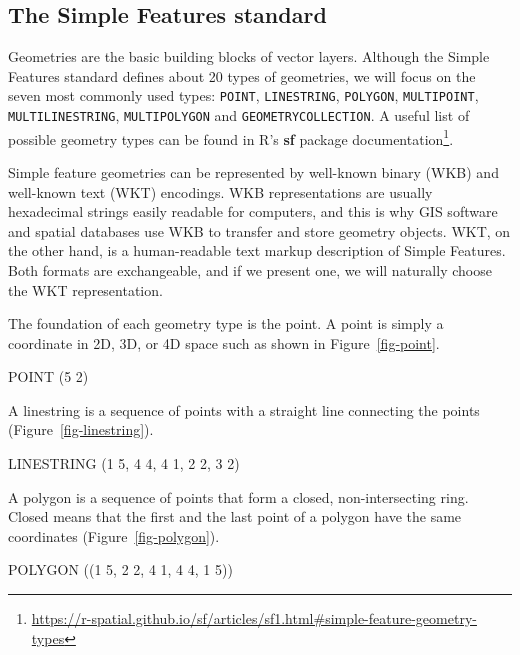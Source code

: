 \documentclass[
  letterpaper,
]{krantz}
\newenvironment{Shaded}{\begin{snugshade}}{\end{snugshade}}
\newcommand{\NormalTok}[1]{\textcolor[rgb]{0.00,0.23,0.31}{#1}}
\begin{document}
\subsection{The Simple Features standard}\label{sec-simple-features}

Geometries are the basic building blocks of vector layers. Although the
Simple Features standard defines about 20 types of geometries, we will
focus on the seven most commonly used types: \texttt{POINT},
\texttt{LINESTRING}, \texttt{POLYGON}, \texttt{MULTIPOINT},
\texttt{MULTILINESTRING}, \texttt{MULTIPOLYGON} and
\texttt{GEOMETRYCOLLECTION}. A useful list of possible geometry types
can be found in R's \textbf{sf} package documentation\footnote{\url{https://r-spatial.github.io/sf/articles/sf1.html\#simple-feature-geometry-types}}.

Simple feature geometries can be represented by well-known binary (WKB)
and well-known text (WKT) encodings. WKB representations are usually
hexadecimal strings easily readable for computers, and this is why GIS
software and spatial databases use WKB to transfer and store geometry
objects. WKT, on the other hand, is a human-readable text markup
description of Simple Features. Both formats are exchangeable, and if we
present one, we will naturally choose the WKT representation.

The foundation of each geometry type is the point. A point is simply a
coordinate in 2D, 3D, or 4D space such as shown in
Figure~\ref{fig-point}.

\begin{Shaded}
\begin{Highlighting}[]
\NormalTok{POINT (5 2)}
\end{Highlighting}
\end{Shaded}

A linestring is a sequence of points with a straight line connecting the
points (Figure~\ref{fig-linestring}).

\begin{Shaded}
\begin{Highlighting}[]
\NormalTok{LINESTRING (1 5, 4 4, 4 1, 2 2, 3 2)}
\end{Highlighting}
\end{Shaded}

A polygon is a sequence of points that form a closed, non-intersecting
ring. Closed means that the first and the last point of a polygon have
the same coordinates (Figure~\ref{fig-polygon}).

\begin{Shaded}
\begin{Highlighting}[]
\NormalTok{POLYGON ((1 5, 2 2, 4 1, 4 4, 1 5))}
\end{Highlighting}
\end{Shaded}
\end{document}
